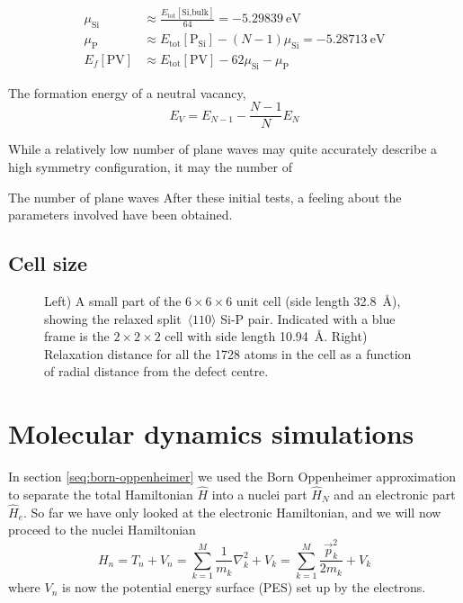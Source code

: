 \documentclass[11pt,bibliography=totoc,index=totoc]{scrbook}   %
\begin{document}
\begin{align}
  \mu_{\text{Si}} &\approx \frac{E_{\text{tot}}[\text{Si,bulk}]}{64} = \SI{-5.29839}{\electronvolt} \\
  \mu_{\text{P}} &\approx E_{\text{tot}}[\text{P}_{\text{Si}}] - (N-1)\mu_{\text{Si}}
  = \SI{-5.28713}{\electronvolt}\\
  E_f[\text{PV}] &\approx E_{\text{tot}}[\text{PV}] - 62\mu_{\text{Si}} - \mu_{\text{P}}
\end{align}

The formation energy of a neutral vacancy,
\begin{equation}
  E_V = E_{N-1} - \frac{N-1}{N} E_N 
\end{equation}


While a relatively low number of plane waves 
may quite accurately describe a high symmetry configuration, it may 
the number of 

The number of plane waves 
After these initial tests, a feeling about the parameters involved have been obtained. 

\section{Cell size}

\begin{figure}[htp]
  \centering
  \caption{Left) A small part of the $6\times 6\times 6$ unit cell (side length 32.8~Å), showing the 
  relaxed split~$\langle 110 \rangle$ Si-P pair.
  Indicated with a blue frame is the $2\times 2\times 2$ cell with side length 10.94~Å.
  Right) Relaxation distance for all the 1728 atoms in the cell as a function of radial distance from the defect centre.}
  \label{fig:cellsize}
\end{figure}


\chapter{Molecular dynamics simulations}\label{cha:molecular-dynamics}

In section \ref{seq:born-oppenheimer} we used the Born Oppenheimer approximation to separate the total Hamiltonian $\hat{H}$ into a nuclei part $\hat{H}_N$ and an electronic part $\hat{H}_e$. 
So far we have only looked at the electronic Hamiltonian, and we will now proceed to the nuclei Hamiltonian
\begin{equation}
  H_n = T_n + V_n = \sum_{k=1}^M \frac{1}{m_k}\nabla_k^2 + V_k = \sum_{k=1}^M \frac{\vec{p}_k^2}{2m_k} + V_k
  \label{eq:nucleiHamiltonian}
\end{equation}
where $V_n$ is now the potential energy surface (PES) set up by the electrons.
\end{document}
